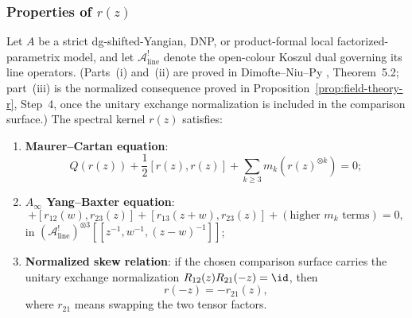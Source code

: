 \subsubsection{Properties of $r(z)$}

\begin{theorem}
\label{thm:spectral_R_YBE}
Let $A$ be a strict dg-shifted-Yangian, DNP, or product-formal local
factorized-parametrix model, and let
$\mathcal{A}^!_{\mathrm{line}}$ denote the open-colour Koszul dual
governing its line operators.
\textup{(}Parts~(i) and~(ii) are proved
in Dimofte--Niu--Py \textup{\cite{DNP25}}, Theorem~5.2;
part~(iii) is the normalized consequence proved in
Proposition~\textup{\ref{prop:field-theory-r}}, Step~4, once the
unitary exchange normalization is included in the comparison
surface.\textup{)}
The spectral kernel $r(z)$ satisfies:
\begin{enumerate}[label=(\roman*)]
\item \textbf{Maurer--Cartan equation}:
\begin{equation}
Q(r(z)) + \frac{1}{2}[r(z), r(z)] + \sum_{k \geq 3} m_k(r(z)^{\otimes k}) = 0;
\end{equation}

\item \textbf{$A_\infty$ Yang--Baxter equation}:
\begin{equation}
[r_{12}(w), r_{13}(z+w)] + [r_{12}(w), r_{23}(z)] + [r_{13}(z+w), r_{23}(z)] + (\text{higher $m_k$ terms}) = 0,
\end{equation}
in $(\mathcal{A}^!_{\mathrm{line}})^{\otimes 3}
[[z^{-1}, w^{-1}, (z-w)^{-1}]]$;

\item \textbf{Normalized skew relation}: if the chosen comparison
surface carries the unitary exchange normalization
\(R_{12}(z)R_{21}(-z)=\id\), then
\begin{equation}
r(-z) = -r_{21}(z),
\end{equation}
where $r_{21}$ means swapping the two tensor factors.
\end{enumerate}
\end{theorem}

